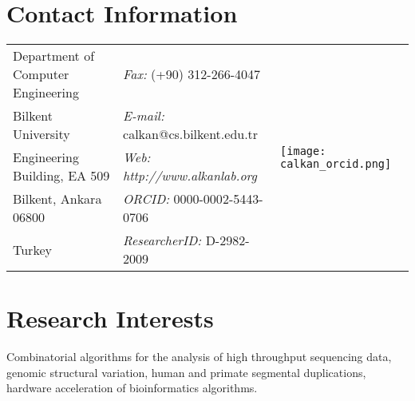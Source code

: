 \documentclass[margin,line]{res}
\begin{document}

\begin{resume}

  \section{\sc Contact Information}
  \vspace{.05in}
  \begin{tabular}{@{}p{2.5in}p{2.3in}p{1in}}
 Department of Computer Engineering & {\it Fax:}    (+90) 312-266-4047  & \multirow{5}{*}{\texttt{[image: calkan\_orcid.png]}}\\            
    Bilkent University   & {\it E-mail:}  calkan@cs.bilkent.edu.tr & \\         
    Engineering Building, EA 509   & {\it Web: http://www.alkanlab.org} &\\        
    Bilkent, Ankara 06800 & {\it ORCID: } 0000-0002-5443-0706 &\\ 
    Turkey & {\it ResearcherID: } D-2982-2009 &\\ 
  \end{tabular}


  
  
  \section{\sc Research Interests}
  Combinatorial algorithms for the analysis of high throughput sequencing data, 
  genomic structural variation,  human and primate
  segmental duplications, hardware acceleration of bioinformatics algorithms. %


\end{resume}
\end{document}
